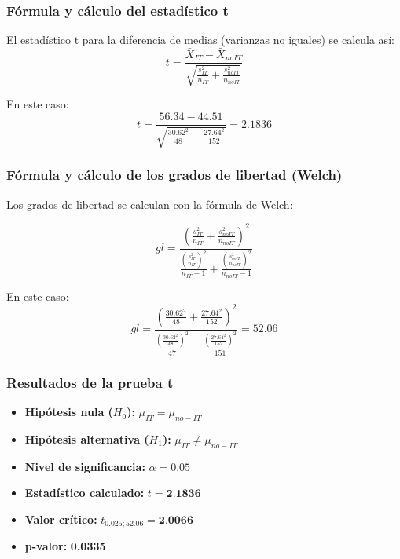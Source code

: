 \begin{multicols}{2}

\subsubsection*{Fórmula y cálculo del estadístico t}

El estadístico t para la diferencia de medias (varianzas no iguales) se calcula así:
\begin{equation*}
    t = \frac{\bar{X}_{IT} - \bar{X}_{noIT}}{\sqrt{\frac{s_{IT}^2}{n_{IT}} + \frac{s_{noIT}^2}{n_{noIT}}}}
\end{equation*}

En este caso:
\begin{equation*}
    t = \frac{56.34 - 44.51}{\sqrt{\frac{30.62^2}{48} + \frac{27.64^2}{152}}} = 2.1836
\end{equation*}

\vfill
\columnbreak

\subsubsection*{Fórmula y cálculo de los grados de libertad (Welch)}

Los grados de libertad se calculan con la fórmula de Welch:

\begin{equation*}
    gl = \frac{\left( \frac{s_{IT}^2}{n_{IT}} + \frac{s_{noIT}^2}{n_{noIT}} \right)^2}
    {\frac{\left( \frac{s_{IT}^2}{n_{IT}} \right)^2}{n_{IT}-1} + \frac{\left( \frac{s_{noIT}^2}{n_{noIT}} \right)^2}{n_{noIT}-1}}
\end{equation*}

En este caso:
\begin{equation*}
gl = \frac{\left( \frac{30.62^2}{48} + \frac{27.64^2}{152} \right)^2}
{\frac{\left( \frac{30.62^2}{48} \right)^2}{47} + \frac{\left( \frac{27.64^2}{152} \right)^2}{151}} = 52.06
\end{equation*}

\end{multicols}

\subsubsection*{Resultados de la prueba t}
\begin{itemize}
    \item \textbf{Hipótesis nula ($H_0$):} $\mu_{IT} = \mu_{no-IT}$
    \item \textbf{Hipótesis alternativa ($H_1$):} $\mu_{IT} \neq \mu_{no-IT}$
    \item \textbf{Nivel de significancia:} $\alpha = 0.05$
    \item \textbf{Estadístico calculado:} $t = \textbf{2.1836}$
    \item \textbf{Valor crítico:} $t_{0.025; 52.06} = \textbf{2.0066}$
    \item \textbf{p-valor:} \textbf{0.0335}
\end{itemize}

